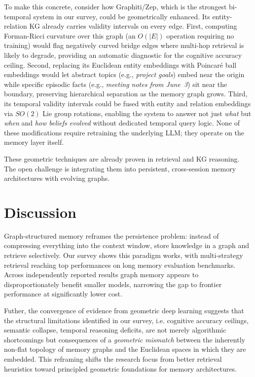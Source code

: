 \documentclass[hf]{ceurart}
\begin{document}
To make this concrete, consider how Graphiti/Zep, which is the strongest
bi-temporal system in our survey, could be geometrically enhanced.
Its entity-relation KG already carries validity intervals on every
edge. First, computing Forman-Ricci curvature over this graph
(an $O(|E|)$ operation requiring no training) would flag negatively
curved bridge edges where multi-hop retrieval is likely to
degrade, providing an automatic diagnostic for the cognitive
accuracy ceiling. Second, replacing its Euclidean entity embeddings
with Poincar\'{e} ball embeddings would let abstract topics
(e.g., \emph{project goals}) embed near the origin while specific
episodic facts (e.g., \emph{meeting notes from June~3}) sit near the
boundary, preserving hierarchical separation as the memory graph
grows. Third, its temporal validity intervals could be fused with
entity and relation embeddings via $SO(2)$ Lie group rotations,
enabling the system to answer not just \emph{what} but \emph{when}
and \emph{how beliefs evolved} without dedicated temporal query logic.
None of these modifications require retraining the underlying LLM;
they operate on the memory layer itself.

These geometric techniques are already proven in retrieval and KG
reasoning. The open challenge is integrating them into persistent,
cross-session memory architectures with evolving graphs.

\section{Discussion}
\label{sec:discussion}

Graph-structured memory reframes the persistence problem: instead of
compressing everything into the context window, store knowledge in a
graph and retrieve selectively. Our survey shows this paradigm works,
with multi-strategy retrieval reaching top performances on long memory
evaluation benchmarks. Across independently reported results graph
memory appears to disproportionately benefit smaller models, narrowing
the gap to frontier performance at significantly lower cost.

Futher, the convergence of evidence from geometric deep learning suggests that
the structural limitations identified in our survey, i.e. cognitive
accuracy ceilings, semantic collapse, temporal reasoning deficits, are
not merely algorithmic shortcomings but consequences of a
\emph{geometric mismatch} between the inherently non-flat topology of
memory graphs and the Euclidean spaces in which they are embedded.
This reframing shifts the research focus from better retrieval
heuristics toward principled geometric foundations for memory
architectures.
\end{document}
